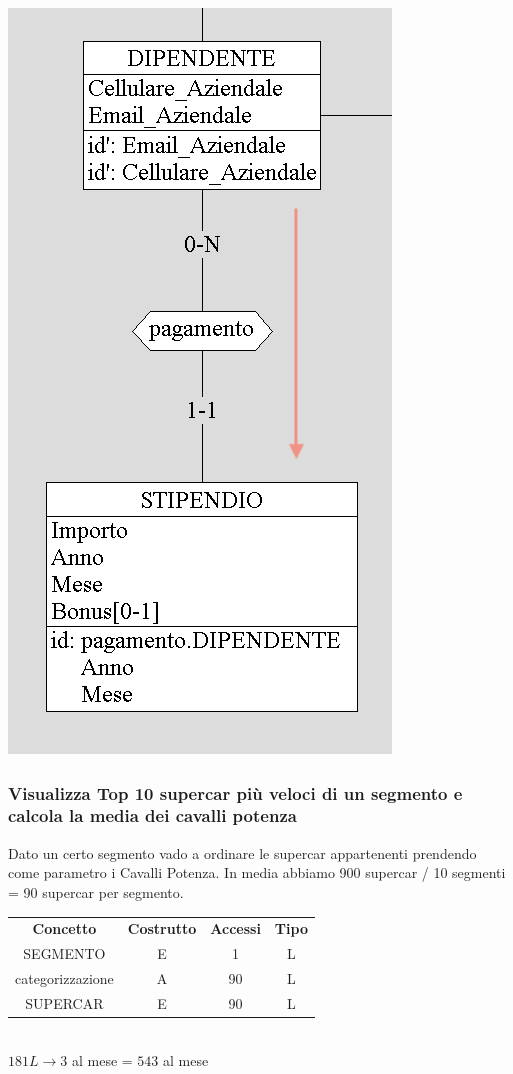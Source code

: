 \documentclass[12pt]{article}
\begin{document}
\begin{center}
    \includegraphics[scale=0.53]{images/navigationSchemes/bonusDipendente.png}
\end{center}

\subsubsection{Visualizza Top 10 supercar più veloci di un segmento e calcola la
media dei cavalli potenza}

Dato un certo segmento vado a ordinare le supercar appartenenti prendendo come
parametro i Cavalli Potenza. In media abbiamo 900 supercar / 10 segmenti = 90
supercar per segmento.

\begin{table}[H]
    \centering
    \begin{tabular}{c c c c }
        \rowcolor{red!20!}
        \textbf{Concetto} & \textbf{Costrutto} & \textbf{Accessi} &
        \textbf{Tipo}\\
        SEGMENTO & E & 1 & L \\
        categorizzazione & A & 90 & L \\
        SUPERCAR & E & 90 & L \\
    \end{tabular}\\
    \( 181L  \rightarrow  3 \) al mese = \( 543 \) al mese
\end{table}
\end{document}
